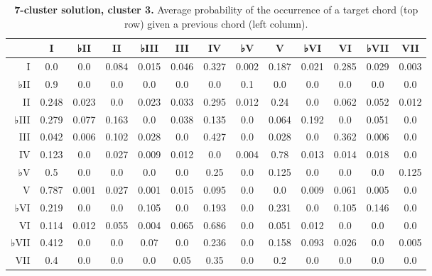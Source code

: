 \begin{table}[htbp]
\begin{minipage}{\linewidth}
\setlength{\tymax}{0.5\linewidth}
\centering
\small
\caption{\textbf{7-cluster solution, cluster 3.} Average probability of the occurrence of a target chord (top row) given a previous chord (left column).}
\label{7-clustersolutioncluster3.averageprobabilityoftheoccurrenceofatargetchordtoprowgivenapreviouschordleftcolumn.}
\begin{tabulary}{\textwidth}{@{}RCCCCCCCCCCCC@{}} \toprule
&I&♭II&II&♭III&III&IV&♭V&V&♭VI&VI&♭VII&VII\\
\midrule
I&0.0&0.0&0.084&0.015&0.046&0.327&0.002&0.187&0.021&0.285&0.029&0.003\\
♭II&0.9&0.0&0.0&0.0&0.0&0.0&0.1&0.0&0.0&0.0&0.0&0.0\\
II&0.248&0.023&0.0&0.023&0.033&0.295&0.012&0.24&0.0&0.062&0.052&0.012\\
♭III&0.279&0.077&0.163&0.0&0.038&0.135&0.0&0.064&0.192&0.0&0.051&0.0\\
III&0.042&0.006&0.102&0.028&0.0&0.427&0.0&0.028&0.0&0.362&0.006&0.0\\
IV&0.123&0.0&0.027&0.009&0.012&0.0&0.004&0.78&0.013&0.014&0.018&0.0\\
♭V&0.5&0.0&0.0&0.0&0.0&0.25&0.0&0.125&0.0&0.0&0.0&0.125\\
V&0.787&0.001&0.027&0.001&0.015&0.095&0.0&0.0&0.009&0.061&0.005&0.0\\
♭VI&0.219&0.0&0.0&0.105&0.0&0.193&0.0&0.231&0.0&0.105&0.146&0.0\\
VI&0.114&0.012&0.055&0.004&0.065&0.686&0.0&0.051&0.012&0.0&0.0&0.0\\
♭VII&0.412&0.0&0.0&0.07&0.0&0.236&0.0&0.158&0.093&0.026&0.0&0.005\\
VII&0.4&0.0&0.0&0.0&0.05&0.35&0.0&0.2&0.0&0.0&0.0&0.0\\

\bottomrule

\end{tabulary}
\end{minipage}
\end{table}

